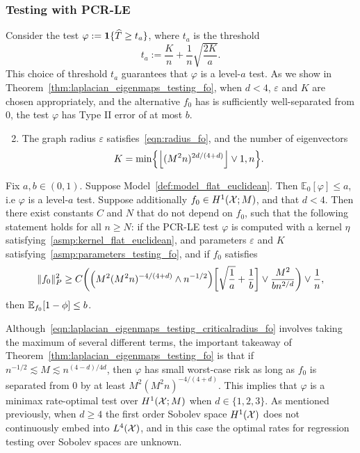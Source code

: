 \subsubsection{Testing with PCR-LE} 
Consider the test $\varphi := \mathbf{1}\{\widehat{T} \geq t_{a}\}$, where $t_{a}$ is the threshold
\begin{equation*}
t_{a} := \frac{K}{n} + \frac{1}{n}\sqrt{\frac{2K}{a}}.
\end{equation*}
This choice of threshold $t_{a}$ guarantees that $\varphi$ is a level-$a$ test. As we show in Theorem~\ref{thm:laplacian_eigenmaps_testing_fo}, when $d < 4$, $\varepsilon$ and $K$ are chosen appropriately, and the alternative $f_0$ has is sufficiently well-separated from $0$, the test $\varphi$ has Type II error of at most $b$.

\begin{enumerate}[label=(P\arabic*)]
	\setcounter{enumi}{1}
	\item 
	\label{asmp:parameters_testing_fo}
	The graph radius $\varepsilon$ satisfies~\eqref{eqn:radius_fo}, and the number of eigenvectors 
	\begin{equation}
	\label{eqn:eigenvector_testing_fo}
	K = \min\Bigl\{\left\lfloor (M^2n)^{2d/(4 + d)} \right\rfloor \vee 1, n\Bigr\}.
	\end{equation}
\end{enumerate}
\begin{theorem}
	\label{thm:laplacian_eigenmaps_testing_fo}
	Fix $a,b \in (0,1)$. Suppose Model~\ref{def:model_flat_euclidean}. Then $\mathbb{E}_0[\varphi] \leq a$, i.e $\varphi$ is a level-$a$ test. Suppose additionally $f_0 \in H^1(\mathcal{X};M)$, and that $d < 4$. Then there exist constants $C$ and $N$ that do not depend on $f_0$, such that the following statement holds for all $n \geq N$: if the PCR-LE test $\varphi$ is computed with a kernel $\eta$ satisfying~\ref{asmp:kernel_flat_euclidean}, and parameters $\varepsilon$ and $K$ satisfying~\ref{asmp:parameters_testing_fo}, and if $f_0$ satisfies
	\begin{equation}
	\label{eqn:laplacian_eigenmaps_testing_criticalradius_fo}
	\|f_0\|_P^2 \geq C\biggl(\Bigl(M^2(M^2n)^{-4/(4 + d) } \wedge n^{-1/2}\Bigr)\biggl[\sqrt{\frac{1}{a}} + \frac{1}{b}\biggr] \vee \frac{M^2}{b n^{2/d}} \biggr) \vee \frac{1}{n},
	\end{equation}
	then $\mathbb{E}_{f_0}[1 - \phi] \leq b$.
\end{theorem}
Although~\eqref{eqn:laplacian_eigenmaps_testing_criticalradius_fo} involves taking the maximum of several different terms, the important takeaway of Theorem~\ref{thm:laplacian_eigenmaps_testing_fo} is that if $n^{-1/2} \lesssim M \lesssim n^{(4 - d)/4d}$, then $\varphi$ has small worst-case risk as long as $f_0$ is separated from $0$ by at least $M^2(M^2n)^{-4/(4 + d)}$. This implies that $\varphi$ is a minimax rate-optimal test over $H^1(\mathcal{X};M)$ when $d \in \{1,2,3\}$. As mentioned previously, when $d \geq 4$ the first order Sobolev space $H^1(\mathcal{X})$ does not continuously embed into $L^4(\mathcal{X})$, and in this case the optimal rates for regression testing over Sobolev spaces are unknown.


